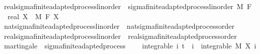 \begin{isabellebody}
\isamarkupfalse%
\ real{\isacharunderscore}{\kern0pt}sigma{\isacharunderscore}{\kern0pt}finite{\isacharunderscore}{\kern0pt}adapted{\isacharunderscore}{\kern0pt}process{\isacharunderscore}{\kern0pt}linorder\ {\isacharequal}{\kern0pt}\ sigma{\isacharunderscore}{\kern0pt}finite{\isacharunderscore}{\kern0pt}adapted{\isacharunderscore}{\kern0pt}process{\isacharunderscore}{\kern0pt}linorder\ M\ F\ {\isachardoublequoteopen}{}\ {\isacharcolon}{\kern0pt}{\isacharcolon}{\kern0pt}\ real{\isachardoublequoteclose}\ X\ \ M\ F\ X\isanewline
\isanewline
{}\isamarkupfalse%
\ nat{\isacharunderscore}{\kern0pt}sigma{\isacharunderscore}{\kern0pt}finite{\isacharunderscore}{\kern0pt}adapted{\isacharunderscore}{\kern0pt}process{\isacharunderscore}{\kern0pt}linorder\ {\isasymsubseteq}\ nat{\isacharunderscore}{\kern0pt}sigma{\isacharunderscore}{\kern0pt}finite{\isacharunderscore}{\kern0pt}adapted{\isacharunderscore}{\kern0pt}process{\isacharunderscore}{\kern0pt}order%
\isadelimproof
\ %
\endisadelimproof
%
\isatagproof
\isacommand{{\isachardot}{\kern0pt}{\isachardot}{\kern0pt}}\isamarkupfalse%
%
\endisatagproof
{\isafoldproof}%
%
\isadelimproof
%
\endisadelimproof
\isanewline
{}\isamarkupfalse%
\ real{\isacharunderscore}{\kern0pt}sigma{\isacharunderscore}{\kern0pt}finite{\isacharunderscore}{\kern0pt}adapted{\isacharunderscore}{\kern0pt}process{\isacharunderscore}{\kern0pt}linorder\ {\isasymsubseteq}\ real{\isacharunderscore}{\kern0pt}sigma{\isacharunderscore}{\kern0pt}finite{\isacharunderscore}{\kern0pt}adapted{\isacharunderscore}{\kern0pt}process{\isacharunderscore}{\kern0pt}order%
\isadelimproof
\ %
\endisadelimproof
%
\isatagproof
\isacommand{{\isachardot}{\kern0pt}{\isachardot}{\kern0pt}}\isamarkupfalse%
%
\endisatagproof
{\isafoldproof}%
%
\isadelimproof
%
\endisadelimproof
%
\isadelimdocument
%
\endisadelimdocument
%
\isatagdocument
%
\isamarkuptrue%
%
\endisatagdocument
{\isafolddocument}%
%
\isadelimdocument
%
\endisadelimdocument
{}\isamarkupfalse%
\ martingale\ {\isacharequal}{\kern0pt}\ sigma{\isacharunderscore}{\kern0pt}finite{\isacharunderscore}{\kern0pt}adapted{\isacharunderscore}{\kern0pt}process\ {\isacharplus}{\kern0pt}\isanewline
\ \ \ integrable{\isacharcolon}{\kern0pt}\ {\isachardoublequoteopen}{\isasymAnd}i{\isachardot}{\kern0pt}\ t\ {\isasymle}\ i\ {\isasymLongrightarrow}\ integrable\ M\ {\isacharparenleft}{\kern0pt}X\ i{\isacharparenright}{\kern0pt}{\isachardoublequoteclose}\isanewline

\end{isabellebody}
